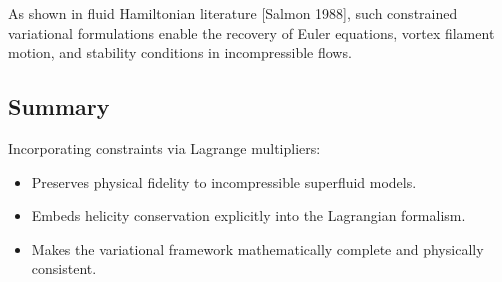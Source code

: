 As shown in fluid Hamiltonian literature [Salmon 1988], such constrained variational formulations enable the recovery of Euler equations, vortex filament motion, and stability conditions in incompressible flows.

\subsection*{Summary}

Incorporating constraints via Lagrange multipliers:
\begin{itemize}
    \item Preserves physical fidelity to incompressible superfluid models.
    \item Embeds helicity conservation explicitly into the Lagrangian formalism.
    \item Makes the variational framework mathematically complete and physically consistent.
\end{itemize}
